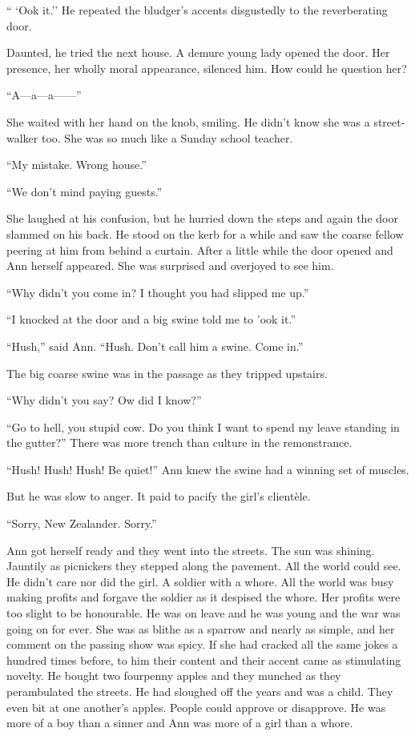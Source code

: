 `` `Ook it.'' He repeated the bludger's accents disgustedly to the reverberating door.

Daunted, he tried the next house. A demure young lady opened the door. Her presence, her wholly moral appearance, silenced him. How could he question her?

``A---a---a------''

She waited with her hand on the knob, smiling. He didn't know she was a street-walker too. She was so much like a Sunday school teacher.

``My mistake. Wrong house.''

``We don't mind paying guests.''

She laughed at his confusion, but he hurried down the steps and again the door slammed on his back. He stood on the kerb for a while and saw  the coarse fellow peering at him from behind a curtain. After a little while the door opened and Ann herself appeared. She was surprised and overjoyed to see him.

``Why didn't you come in? I thought you had slipped me up.''

``I knocked at the door and a big swine told me to 'ook it.''

``Hush,'' said Ann. ``Hush. Don't call him a swine. Come in.''

The big coarse swine was in the passage as they tripped upstairs.

``Why didn't you say? Ow did I know?''

``Go to hell, you stupid cow. Do you think I want to spend my leave standing in the gutter?'' There was more trench than culture in the remonstrance.

``Hush! Hush! Hush! Be quiet!'' Ann knew the swine had a winning set of muscles.

But he was slow to anger. It paid to pacify the girl's clientèle.

``Sorry, New Zealander. Sorry.''

Ann got herself ready and they went into the streets. The sun was shining. Jauntily as picnickers they stepped along the pavement. All the world could see. He didn't care nor did the girl. A soldier with a whore. All the world was busy making profits and forgave the soldier as it despised the whore. Her profits were too slight to be honourable. He was on leave and he was young and the war was going on for ever. She was as blithe as a sparrow and nearly as simple, and her comment on the passing show was spicy. If she had cracked all the same jokes a hundred times before, to him their content and their accent came as stimulating novelty. He bought two fourpenny apples and they munched as they perambulated the streets. He had sloughed off the years and was a child. They even bit at one another's apples. People could approve or disapprove. He was more of a boy than a sinner and Ann was more of a girl than a whore.

